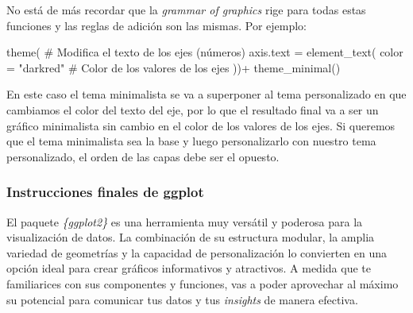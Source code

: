 \documentclass[
  letterpaper,
  DIV=11,
  numbers=noendperiod,
  oneside]{scrreprt}
\newenvironment{Shaded}{\begin{snugshade}}{\end{snugshade}}
\newcommand{\AttributeTok}[1]{\textcolor[rgb]{0.40,0.45,0.13}{#1}}
\newcommand{\CommentTok}[1]{\textcolor[rgb]{0.37,0.37,0.37}{#1}}
\newcommand{\FunctionTok}[1]{\textcolor[rgb]{0.28,0.35,0.67}{#1}}
\newcommand{\NormalTok}[1]{\textcolor[rgb]{0.00,0.23,0.31}{#1}}
\newcommand{\SpecialCharTok}[1]{\textcolor[rgb]{0.37,0.37,0.37}{#1}}
\newcommand{\StringTok}[1]{\textcolor[rgb]{0.13,0.47,0.30}{#1}}
\begin{document}
\begin{tcolorbox}[enhanced jigsaw, breakable, rightrule=.15mm, colbacktitle=quarto-callout-tip-color!10!white, bottomtitle=1mm, arc=.35mm, titlerule=0mm, left=2mm, toprule=.15mm, leftrule=.75mm, colback=white, opacitybacktitle=0.6, opacityback=0, colframe=quarto-callout-tip-color-frame, bottomrule=.15mm, coltitle=black, toptitle=1mm, title=\textcolor{quarto-callout-tip-color}{\faLightbulb}\hspace{0.5em}{Capas adicionales y la grammar of graphics}]
No está de más recordar que la \emph{grammar of graphics} rige para
todas estas funciones y las reglas de adición son las mismas. Por
ejemplo:

\begin{Shaded}
\begin{Highlighting}[]
  \FunctionTok{theme}\NormalTok{(}
    \CommentTok{\# Modifica el texto de los ejes (números)}
    \AttributeTok{axis.text =} \FunctionTok{element\_text}\NormalTok{(}
      \AttributeTok{color =} \StringTok{"darkred"}   \CommentTok{\# Color de los valores de los ejes}
\NormalTok{    ))}\SpecialCharTok{+}
    \FunctionTok{theme\_minimal}\NormalTok{()}
\end{Highlighting}
\end{Shaded}

En este caso el tema minimalista se va a superponer al tema
personalizado en que cambiamos el color del texto del eje, por lo que el
resultado final va a ser un gráfico minimalista sin cambio en el color
de los valores de los ejes. Si queremos que el tema minimalista sea la
base y luego personalizarlo con nuestro tema personalizado, el orden de
las capas debe ser el opuesto.
\end{tcolorbox}

\hypertarget{instrucciones-finales-de-ggplot}{%
\subsubsection{Instrucciones finales de
ggplot}\label{instrucciones-finales-de-ggplot}}

El paquete \emph{\{ggplot2\}} es una herramienta muy versátil y poderosa
para la visualización de datos. La combinación de su estructura modular,
la amplia variedad de geometrías y la capacidad de personalización lo
convierten en una opción ideal para crear gráficos informativos y
atractivos. A medida que te familiarices con sus componentes y
funciones, vas a poder aprovechar al máximo su potencial para comunicar
tus datos y tus \emph{insights} de manera efectiva.
\end{document}
